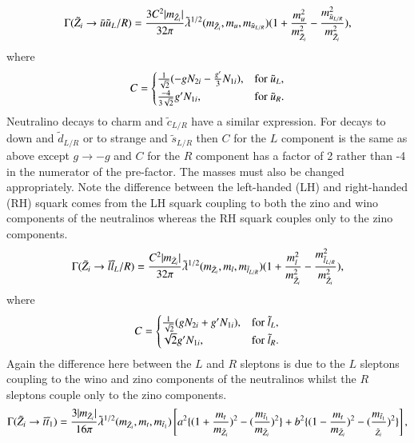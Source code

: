 \documentclass[final,3p,times]{elsarticle}
\begin{document}
\begin{equation}\label{neutuuLR}
\Gamma (\tilde{Z}_i \rightarrow \bar{u} \tilde{u}_L/R) = {3 C^2 |m_{\tilde{Z}_i}| \over 32\pi} \tilde{\lambda}^{1/2} (m_{\tilde{Z}_i}, m_u, m_{\tilde{u}_{L/R}}) (1+ {m_{u}^2 \over m_{\tilde{Z}_i}^2}  - {m_{\tilde{u}_{L/R}}^2 \over m_{\tilde{Z}_i}^2}),
\end{equation} 
where
\begin{equation}
  C=\begin{cases}
    {1 \over \sqrt{2}}(-g N_{2i} - {g' \over 3} N_{1i}), & \text{for $\tilde{u}_L$},\\
    {-4 \over 3\sqrt{2}}g' N_{1i}, & \text{for $\tilde{u}_R$}.
  \end{cases}
\end{equation}
Neutralino decays to charm and $\tilde{c}_{L/R}$ have a similar expression.
For decays to down and $\tilde{d}_{L/R}$ or to strange and $\tilde{s}_{L/R}$ then $C$ for the $L$ component is the
same as above except $g \rightarrow -g$ and $C$ for the $R$ component has a factor of 2 rather than -4 in the
numerator of the pre-factor. The masses must also be changed appropriately. Note the
difference between the left-handed (LH) and right-handed
(RH) squark comes from the LH squark coupling to both the zino and
wino components of the neutralinos whereas the RH squark couples only to the zino components.
\begin{equation}\label{neutllLR}
\Gamma (\tilde{Z}_i \rightarrow \bar{l} \tilde{l}_L/R) = {C^2 |m_{\tilde{Z}_i}| \over 32\pi} \tilde{\lambda}^{1/2} (m_{\tilde{Z}_i}, m_l, m_{\tilde{l}_{L/R}}) (1+ {m_{l}^2 \over m_{\tilde{Z}_i}^2}  - {m_{\tilde{l}_{L/R}}^2 \over m_{\tilde{Z}_i}^2}),
\end{equation} 
where
\begin{equation}
  C=\begin{cases}
    {1 \over \sqrt{2}}(g N_{2i} + g' N_{1i}), & \text{for $\tilde{l}_L$},\\
    \sqrt{2} g' N_{1i}, & \text{for $\tilde{l}_R$}.
  \end{cases}
\end{equation}
Again the difference here between the $L$ and $R$ sleptons is due to the $L$ sleptons coupling to the wino
and zino components of the neutralinos whilst the $R$ sleptons couple only to the zino components.
\begin{equation}\label{neuttst1}
\Gamma (\tilde{Z}_i \rightarrow \bar{t} \tilde{t}_{1}) = {3 |m_{\tilde{Z}_i}| \over 16\pi} \tilde{\lambda}^{1/2} (m_{\tilde{Z}_i}, m_t, m_{\tilde{t}_{1}}) \left[a^2\{(1+{m_t \over m_{\tilde{Z}_i}})^2 - ({m_{\tilde{t}_1} \over m_{\tilde{Z}_i}})^2\} + b^2\{(1-{m_t \over m_{\tilde{Z}_i}})^2 - ({m_{\tilde{t}_1} \over _{\tilde{Z}_i}})^2\}\right],
\end{equation} 
\end{document}
